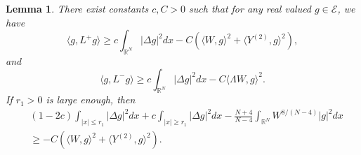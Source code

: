 \documentclass[a4paper,two-side,10pt]{amsart}
\newtheorem{lem}{Lemma}[section]
\newcommand{\R}{\mathbb{R}}
\numberwithin{equation}{section}
\begin{document}
\begin{lem}
\label{lemcoer}
There exist constants $c,C>0$ such that for any real valued $g\in \mathcal{E}$, we have
\begin{equation}
\label{lemcoere1}
\langle g,L^+ g\rangle \geq c \int_{\R^N} |\Delta g|^2 dx - C (\langle W,g\rangle^2 + \langle Y^{(2)} ,g \rangle^2 ),
\end{equation}
and
$$\langle g,L^- g\rangle \geq c \int_{\R^N} |\Delta g|^2 dx - C \langle \Lambda W,g\rangle^2 .$$
If $r_1>0$ is large enough, then
\begin{align}
\label{coercloc1}
&(1-2c) \int_{|x|\leq r_1} |\Delta g|^2 dx +c \int_{|x|\geq r_1} |\Delta g|^2 dx - \frac{N+4}{N-4} \int_{\R^N}   W^{8/(N-4)} |g|^2 dx \nonumber \\
&\geq - C (\langle W,g\rangle^2 + \langle Y^{(2)} ,g \rangle^2).
\end{align}
\end{lem}
\end{document}

